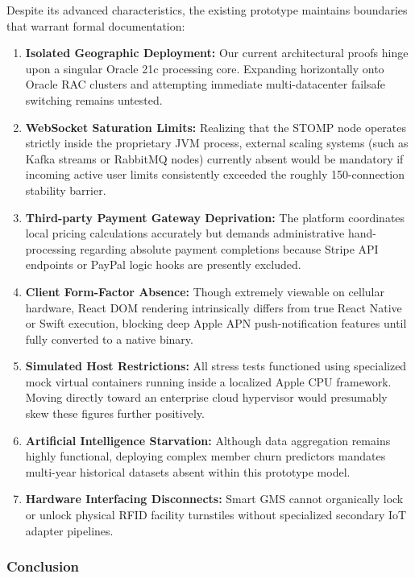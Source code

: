 Despite its advanced characteristics, the existing prototype maintains
boundaries that warrant formal documentation:

\begin{enumerate}
\def\labelenumi{\arabic{enumi}.}
\tightlist
\item
  \textbf{Isolated Geographic Deployment:} Our current architectural
  proofs hinge upon a singular Oracle 21c processing core. Expanding
  horizontally onto Oracle RAC clusters and attempting immediate
  multi-datacenter failsafe switching remains untested.
\item
  \textbf{WebSocket Saturation Limits:} Realizing that the STOMP node
  operates strictly inside the proprietary JVM process, external scaling
  systems (such as Kafka streams or RabbitMQ nodes) currently absent
  would be mandatory if incoming active user limits consistently
  exceeded the roughly 150-connection stability barrier.
\item
  \textbf{Third-party Payment Gateway Deprivation:} The platform
  coordinates local pricing calculations accurately but demands
  administrative hand-processing regarding absolute payment completions
  because Stripe API endpoints or PayPal logic hooks are presently
  excluded.
\item
  \textbf{Client Form-Factor Absence:} Though extremely viewable on
  cellular hardware, React DOM rendering intrinsically differs from true
  React Native or Swift execution, blocking deep Apple APN
  push-notification features until fully converted to a native binary.
\item
  \textbf{Simulated Host Restrictions:} All stress tests functioned
  using specialized mock virtual containers running inside a localized
  Apple CPU framework. Moving directly toward an enterprise cloud
  hypervisor would presumably skew these figures further positively.
\item
  \textbf{Artificial Intelligence Starvation:} Although data aggregation
  remains highly functional, deploying complex member churn predictors
  mandates multi-year historical datasets absent within this prototype
  model.
\item
  \textbf{Hardware Interfacing Disconnects:} Smart GMS cannot
  organically lock or unlock physical RFID facility turnstiles without
  specialized secondary IoT adapter pipelines.
\end{enumerate}

\subsubsection*{Conclusion}\label{conclusion}

